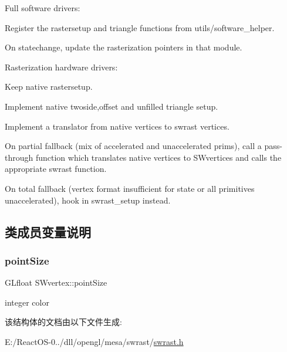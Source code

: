 Full software drivers\+:
\begin{DoxyItemize}
\item Register the rastersetup and triangle functions from utils/software\+\_\+helper.
\item On statechange, update the rasterization pointers in that module.
\end{DoxyItemize}

Rasterization hardware drivers\+:
\begin{DoxyItemize}
\item Keep native rastersetup.
\item Implement native twoside,offset and unfilled triangle setup.
\item Implement a translator from native vertices to swrast vertices.
\item On partial fallback (mix of accelerated and unaccelerated prims), call a pass-\/through function which translates native vertices to S\+Wvertices and calls the appropriate swrast function.
\item On total fallback (vertex format insufficient for state or all primitives unaccelerated), hook in swrast\+\_\+setup instead. 
\end{DoxyItemize}

\subsection{类成员变量说明}
\mbox{\label{struct_s_wvertex_a5af8503a89227ee0f4524cf17db6d3e8}} 
\subsubsection{\texorpdfstring{point\+Size}{pointSize}}
{\footnotesize\ttfamily G\+Lfloat S\+Wvertex\+::point\+Size}

integer color 

该结构体的文档由以下文件生成\+:\begin{DoxyCompactItemize}
\item 
E\+:/\+React\+O\+S-\/0../dll/opengl/mesa/swrast/\hyperlink{swrast_8h}{swrast.\+h}\end{DoxyCompactItemize}

